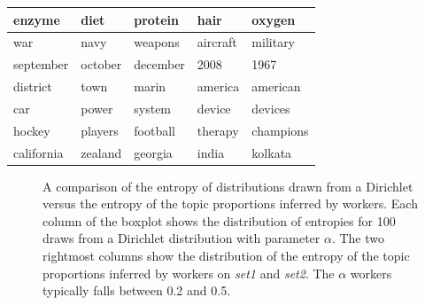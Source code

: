\begin{table}
{\begin{tabular}{|lllll}
  enzyme & diet & protein & hair & oxygen \\ \hline 
  war & navy & weapons & aircraft & military \\ \hline 
  september & october & december & 2008 & 1967 \\ \hline 
  district & town & marin & america & american \\ \hline 
  car & power & system & device & devices \\ \hline 
  hockey & players & football & therapy & champions \\ \hline 
  california & zealand & georgia & india & kolkata \\
\end{tabular}
}
\vspace{0.2in}
\end{table}

\begin{figure}
\centering
{}%

\caption{A comparison of the entropy of distributions drawn from a
  Dirichlet versus the entropy of the topic proportions inferred by
  workers.  Each column of the boxplot shows the distribution of
  entropies for 100 draws from a Dirichlet distribution with parameter
  $\alpha$.  The two rightmost columns show the distribution of the
  entropy of the topic proportions inferred by workers on \emph{set1}
  and \emph{set2}.  The $\alpha$ workers typically falls between 0.2
  and 0.5.}

\label{fig:entropy}
\end{figure}

